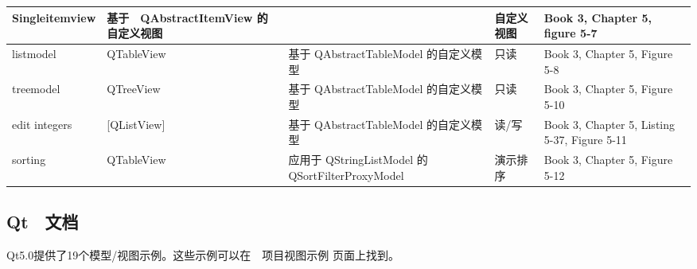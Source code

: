\begin{longtable}[l]{|m{15em}|l|l|l|m{15em}|}
\hline
Singleitemview	& 基于　QAbstractItemView 的自定义视图	&&	自定义视图	&Book 3, Chapter 5, figure 5-7 \\ 
\hline
listmodel &	QTableView	&基于 QAbstractTableModel 的自定义模型	&只读&	Book 3, Chapter 5, Figure 5-8 \\ 
\hline
treemodel	& QTreeView	& 基于 QAbstractTableModel 的自定义模型	&只读	&Book 3, Chapter 5, Figure 5-10 \\ 
\hline
edit integers &	[QListView]	& 基于 QAbstractTableModel 的自定义模型	 & 读/写	& Book 3, Chapter 5, Listing 5-37, Figure 5-11 \\ 
\hline
sorting	 & QTableView	& 应用于 QStringListModel 的 QSortFilterProxyModel	& 演示排序	& Book 3, Chapter 5, Figure 5-12 \\ 
\hline
\end{longtable}

\subsection{Qt　文档}

Qt5.0提供了19个模型/视图示例。这些示例可以在　项目视图示例 页面上找到。


